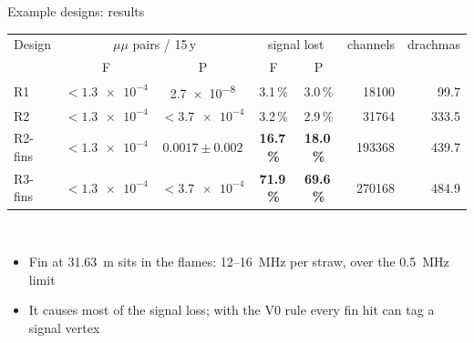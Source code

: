 \documentclass[aspectratio=149,11pt]{beamer}
\begin{document}
\begin{frame}{Example designs: results}
  \centering
  \footnotesize
  \begin{tabular}{@{}lccccrr@{}}
    \toprule
    Design & \multicolumn{2}{c}{$\mu\mu$ pairs / 15\,y} & \multicolumn{2}{c}{signal lost} & channels & drachmas \\
           & F & P & F & P & & \\
    \midrule
    R1 & $< \num{1.3e-4}$ & \num{2.7e-8} & 3.1\,\% & 3.0\,\% & \num{18100} & 99.7 \\
    R2 & $< \num{1.3e-4}$ & $< \num{3.7e-4}$ & 3.2\,\% & 2.9\,\% & \num{31764} & 333.5 \\
    \midrule
    R2-fins & $< \num{1.3e-4}$ & $0.0017 \pm 0.002$ & \textbf{16.7\,\%} & \textbf{18.0\,\%} & \num{193368} & 439.7 \\
    R3-fins & $< \num{1.3e-4}$ & $< \num{3.7e-4}$ & \textbf{71.9\,\%} & \textbf{69.6\,\%} & \num{270168} & 484.9 \\
    \bottomrule
  \end{tabular}\\[6pt]
  \begin{itemize}\small
    \item Fin at \SI{31.63}{m} sits in the flames: 12--\SI{16}{MHz} per straw, over the \SI{0.5}{MHz} limit
    \item It causes most of the signal loss; with the V0 rule every fin hit can tag a signal vertex
  \end{itemize}
\end{frame}

\end{document}
